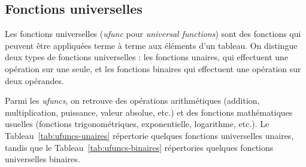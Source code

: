 \documentclass[
  12pt,
]{book}
\numberwithin{equation}{section}
\numberwithin{countremarque}{section}
\begin{document}
\subsection{Fonctions universelles}\label{fonctions-universelles}

Les fonctions universelles (\emph{ufunc} pour \emph{universal functions}) sont des fonctions qui peuvent être appliquées terme à terme aux éléments d'un tableau. On distingue deux types de fonctions universelles : les fonctions unaires, qui effectuent une opération sur une seule, et les fonctions binaires qui effectuent une opération sur deux opérandes.

Parmi les \emph{ufuncs}, on retrouve des opérations arithmétiques (addition, multiplication, puissance, valeur absolue, etc.) et des fonctions mathématiques usuelles (fonctions trigonométriques, exponentielle, logarithme, etc.). Le Tableau~\ref{tab:ufuncs-unaires} répertorie quelques fonctions universelles unaires, tandis que le Tableau~\ref{tab:ufuncs-binaires} répertories quelques fonctions universelles binaires.
\end{document}
